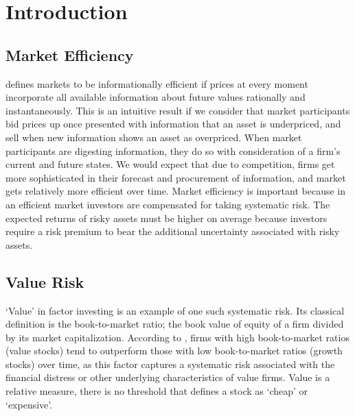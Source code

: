 \section{Introduction}
\subsection{Market Efficiency}
\indent \citet{fama_EMH} defines markets to be informationally efficient if prices at
 every moment incorporate all available information about future values rationally and instantaneously.
 This is an intuitive result if we consider that market participants bid prices up once presented with information that
 an asset is underpriced, and sell when new information shows an asset as overpriced. When market participants are digesting information,
 they do so with consideration of a firm's current and future states. We would expect that due to competition,
 firms get more sophisticated in their forecast and procurement of information, and market gets relatively more
 efficient over time. Market efficiency is important because in an efficient market investors are compensated for
taking systematic risk. The expected returns of risky assets must be higher on average because investors 
require a risk premium to bear the additional uncertainty associated with risky assets.

\subsection{Value Risk}
`Value' in factor investing is an example of one such systematic risk. Its classical definition is the book-to-market ratio; the book value of equity of a firm divided by its market capitalization.
According to \citet{fama_french_1993}, firms with high book-to-market ratios (value stocks) tend to outperform those with low book-to-market ratios (growth stocks) over time, 
as this factor captures a systematic risk associated with the financial distress or other underlying characteristics of value firms.
Value is a relative measure, there is no threshold that defines a stock as `cheap' or `expensive'. 

